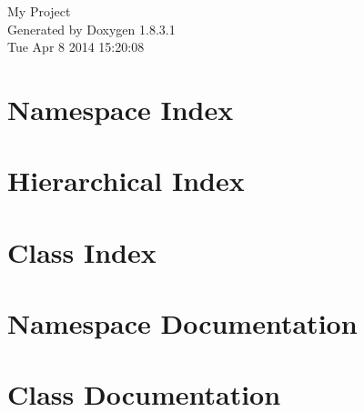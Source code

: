 \documentclass{book}
\begin{document}
\hypersetup{pageanchor=false,citecolor=blue}
\begin{titlepage}
\vspace*{7cm}
\begin{center}
{\Large My Project }\\
\vspace*{1cm}
{\large Generated by Doxygen 1.8.3.1}\\
\vspace*{0.5cm}
{\small Tue Apr 8 2014 15:20:08}\\
\end{center}
\end{titlepage}
\clearemptydoublepage
{}
\tableofcontents
\clearemptydoublepage
{}
\hypersetup{pageanchor=true,citecolor=blue}
\chapter{Namespace Index}

\chapter{Hierarchical Index}

\chapter{Class Index}

\chapter{Namespace Documentation}








\chapter{Class Documentation}











\printindex
\end{document}
